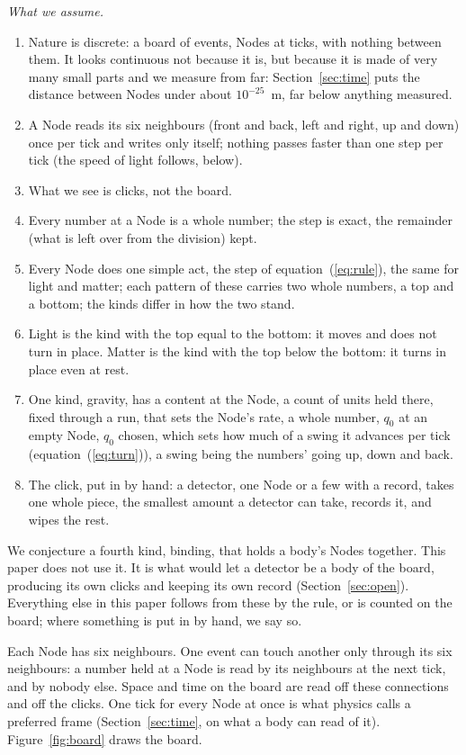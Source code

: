 \documentclass[pdflatex,sn-mathphys-num]{sn-jnl}
\begin{document}
\textit{What we assume.}
\begin{enumerate}
\item Nature is discrete: a board of events, Nodes at ticks, with nothing between them. It looks continuous not because it is, but because it is made of very many small parts and we measure from far: Section~\ref{sec:time} puts the distance between Nodes under about $10^{-25}$~m, far below anything measured.
\item A Node reads its six neighbours (front and back, left and right, up and down) once per tick and writes only itself; nothing passes faster than one step per tick (the speed of light follows, below).
\item What we see is clicks, not the board.
\item Every number at a Node is a whole number; the step is exact, the remainder (what is left over from the division) kept.
\item Every Node does one simple act, the step of equation~(\ref{eq:rule}), the same for light and matter; each pattern of these carries two whole numbers, a top and a bottom; the kinds differ in how the two stand.
\item Light is the kind with the top equal to the bottom: it moves and does not turn in place. Matter is the kind with the top below the bottom: it turns in place even at rest.
\item One kind, gravity, has a content at the Node, a count of units held there, fixed through a run, that sets the Node's rate, a whole number, $q_0$ at an empty Node, $q_0$ chosen, which sets how much of a swing it advances per tick (equation~(\ref{eq:turn})), a swing being the numbers' going up, down and back.
\item The click, put in by hand: a detector, one Node or a few with a record, takes one whole piece, the smallest amount a detector can take, records it, and wipes the rest.
\end{enumerate}
We conjecture a fourth kind, binding, that holds a body's Nodes together. This paper does not use it. It is what would let a detector be a body of the board, producing its own clicks and keeping its own record (Section~\ref{sec:open}). Everything else in this paper follows from these by the rule, or is counted on the board; where something is put in by hand, we say so.

Each Node has six neighbours. One event can touch another only through its six neighbours: a number held at a Node is read by its neighbours at the next tick, and by nobody else. Space and time on the board are read off these connections and off the clicks. One tick for every Node at once is what physics calls a preferred frame (Section~\ref{sec:time}, on what a body can read of it). Figure~\ref{fig:board} draws the board.
\end{document}
